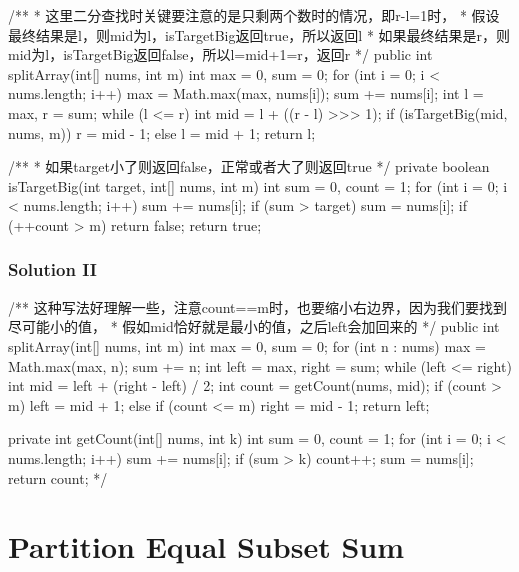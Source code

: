 \begin{Code}
/**
 * 这里二分查找时关键要注意的是只剩两个数时的情况，即r-l=1时，
 * 假设最终结果是l，则mid为l，isTargetBig返回true，所以返回l
 * 如果最终结果是r，则mid为l，isTargetBig返回false，所以l=mid+1=r，返回r
 */
public int splitArray(int[] nums, int m) {
    int max = 0, sum = 0;
    for (int i = 0; i < nums.length; i++) {
        max = Math.max(max, nums[i]);
        sum += nums[i];
    }
    int l = max, r = sum;
    while (l <= r) {
        int mid = l + ((r - l) >>> 1);
        if (isTargetBig(mid, nums, m)) {
            r = mid - 1;
        } else {
            l = mid + 1;
        }
    }
    return l;
}

/**
 *  如果target小了则返回false，正常或者大了则返回true
 */
private boolean isTargetBig(int target, int[] nums, int m) {
    int sum = 0, count = 1;
    for (int i = 0; i < nums.length; i++) {
        sum += nums[i];
        if (sum > target) {
            sum = nums[i];
            if (++count > m) {
                return false;
            }
        }
    }
    return true;
}
\end{Code}

\newpage

\subsubsection{Solution II}
\begin{Code}
/** 这种写法好理解一些，注意count==m时，也要缩小右边界，因为我们要找到尽可能小的值，
 * 假如mid恰好就是最小的值，之后left会加回来的
 */
public int splitArray(int[] nums, int m) {
    int max = 0, sum = 0;
    for (int n : nums) {
        max = Math.max(max, n);
        sum += n;
    }
    int left = max, right = sum;
    while (left <= right) {
        int mid = left + (right - left) / 2;
        int count = getCount(nums, mid);
        if (count > m) {
            left = mid + 1;
        } else if (count <= m) {
            right = mid - 1;
        }
    }
    return left;
}

private int getCount(int[] nums, int k) {
    int sum = 0, count = 1;
    for (int i = 0; i < nums.length; i++) {
        sum += nums[i];
        if (sum > k) {
            count++;
            sum = nums[i];
        }
    }
    return count;
}*/
\end{Code}

\newpage

\section{Partition Equal Subset Sum} %

